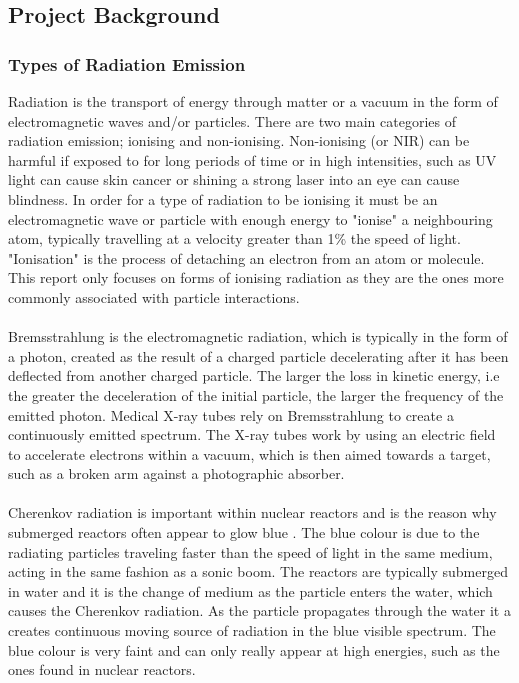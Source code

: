 \documentclass[12pt,a4paper]{article}
\begin{document}
\subsection{Project Background}
\label{back}


\subsubsection{Types of Radiation Emission }
\label{radd}
Radiation is the transport of energy through matter or a vacuum in the form of electromagnetic waves and/or particles. There are two main categories of radiation emission; ionising and non-ionising. Non-ionising (or NIR) can be harmful if exposed to for long periods of time or in high intensities, such as UV light can cause skin cancer or shining a strong laser into an eye can cause blindness. In order for a type of radiation to be ionising it must be an electromagnetic wave or particle with enough energy to "ionise" a neighbouring atom, typically travelling at a velocity greater than 1\% the speed of light.  "Ionisation" is the process of detaching an electron from an atom or molecule. This report only focuses on forms of ionising radiation as they are the ones more commonly associated with particle interactions. 
\\\\ 
\noindent Bremsstrahlung is the electromagnetic radiation, which is typically in the form of a photon, created as the result of a charged particle decelerating after it has been deflected from another charged particle. The larger the loss in kinetic energy, i.e the greater the deceleration of the initial particle, the larger the frequency of the emitted photon. Medical X-ray tubes rely on Bremsstrahlung to create a continuously emitted spectrum. The X-ray tubes work by using an electric field to accelerate electrons within a vacuum, which is then aimed towards a target, such as a broken arm against a photographic absorber.
\\\\
\noindent Cherenkov radiation is important within nuclear reactors and is the reason why submerged reactors often appear to glow blue \cite{blue}. The blue colour is due to the radiating particles traveling faster than the speed of light in the same medium, acting in the same fashion as a sonic boom. The reactors are typically submerged in water and it is the change of medium as the particle enters the water, which causes the Cherenkov radiation. As the particle propagates through the water it a creates continuous moving source of radiation in the blue visible spectrum. The blue colour is very faint and can only really appear at high energies, such as the ones found in nuclear reactors. 
 
\end{document}
